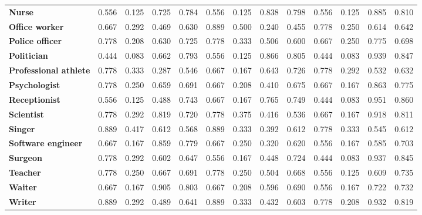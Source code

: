 \begin{table}
\begin{tabular}{lccccccccc}
\textbf{Nurse} & 0.556 & 0.125 & 0.725 & 0.784 & 0.556 & 0.125 & 0.838 & 0.798 & 0.556 & 0.125 & 0.885 & 0.810 \\
\textbf{Office worker} & 0.667 & 0.292 & 0.469 & 0.630 & 0.889 & 0.500 & 0.240 & 0.455 & 0.778 & 0.250 & 0.614 & 0.642 \\
\textbf{Police officer} & 0.778 & 0.208 & 0.630 & 0.725 & 0.778 & 0.333 & 0.506 & 0.600 & 0.667 & 0.250 & 0.775 & 0.698 \\
\textbf{Politician} & 0.444 & 0.083 & 0.662 & 0.793 & 0.556 & 0.125 & 0.866 & 0.805 & 0.444 & 0.083 & 0.939 & 0.847 \\
\textbf{Professional athlete} & 0.778 & 0.333 & 0.287 & 0.546 & 0.667 & 0.167 & 0.643 & 0.726 & 0.778 & 0.292 & 0.532 & 0.632 \\
\textbf{Psychologist} & 0.778 & 0.250 & 0.659 & 0.691 & 0.667 & 0.208 & 0.410 & 0.675 & 0.667 & 0.167 & 0.863 & 0.775 \\
\textbf{Receptionist} & 0.556 & 0.125 & 0.488 & 0.743 & 0.667 & 0.167 & 0.765 & 0.749 & 0.444 & 0.083 & 0.951 & 0.860 \\
\textbf{Scientist} & 0.778 & 0.292 & 0.819 & 0.720 & 0.778 & 0.375 & 0.416 & 0.536 & 0.667 & 0.167 & 0.918 & 0.811 \\
\textbf{Singer} & 0.889 & 0.417 & 0.612 & 0.568 & 0.889 & 0.333 & 0.392 & 0.612 & 0.778 & 0.333 & 0.545 & 0.612 \\
\textbf{Software engineer} & 0.667 & 0.167 & 0.859 & 0.779 & 0.667 & 0.250 & 0.320 & 0.620 & 0.556 & 0.167 & 0.585 & 0.703 \\
\textbf{Surgeon} & 0.778 & 0.292 & 0.602 & 0.647 & 0.556 & 0.167 & 0.448 & 0.724 & 0.444 & 0.083 & 0.937 & 0.845 \\
\textbf{Teacher} & 0.778 & 0.250 & 0.667 & 0.691 & 0.778 & 0.250 & 0.504 & 0.668 & 0.556 & 0.125 & 0.609 & 0.735 \\
\textbf{Waiter} & 0.667 & 0.167 & 0.905 & 0.803 & 0.667 & 0.208 & 0.596 & 0.690 & 0.556 & 0.167 & 0.722 & 0.732 \\
\textbf{Writer} & 0.889 & 0.292 & 0.489 & 0.641 & 0.889 & 0.333 & 0.432 & 0.603 & 0.778 & 0.208 & 0.932 & 0.819 \\
\bottomrule
\end{tabular}
\end{table}
